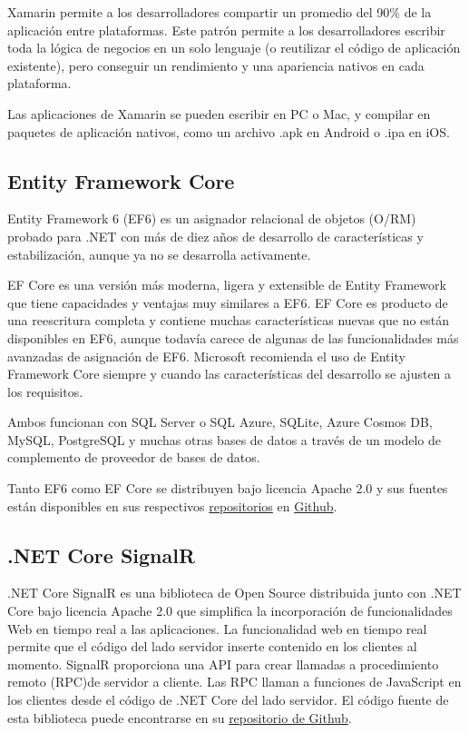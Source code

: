 Xamarin permite a los desarrolladores compartir un promedio del 90\% de la aplicación entre plataformas. Este patrón permite a los desarrolladores escribir toda la lógica de negocios en un solo lenguaje (o reutilizar el código de aplicación existente), pero conseguir un rendimiento y una apariencia nativos en cada plataforma.

Las aplicaciones de Xamarin se pueden escribir en PC o Mac, y compilar en paquetes de aplicación nativos, como un archivo .apk en Android o .ipa en iOS.

\subsection{Entity Framework Core}
Entity Framework 6 (EF6) es un asignador relacional de objetos (O/RM) probado para .NET con más de diez años de desarrollo de características y estabilización, aunque ya no se desarrolla activamente.

EF Core es una versión más moderna, ligera y extensible de Entity Framework que tiene capacidades y ventajas muy similares a EF6. EF Core es producto de una reescritura completa y contiene muchas características nuevas que no están disponibles en EF6, aunque todavía carece de algunas de las funcionalidades más avanzadas de asignación de EF6. Microsoft recomienda el uso de Entity Framework Core siempre y cuando las características del desarrollo se ajusten a los requisitos.

Ambos funcionan con SQL Server o SQL Azure, SQLite, Azure Cosmos DB, MySQL, PostgreSQL y muchas otras bases de datos a través de un modelo de complemento de proveedor de bases de datos.

Tanto EF6 como EF Core se distribuyen bajo licencia Apache 2.0 y sus fuentes están disponibles en sus respectivos \href{https://github.com/dotnet/ef6}{repositorios} en \href{https://github.com/dotnet/efcore}{Github}.

\subsection{.NET Core SignalR}
.NET Core SignalR es una biblioteca de Open Source distribuida junto con .NET Core bajo licencia Apache 2.0 que simplifica la incorporación de funcionalidades Web en tiempo real a las aplicaciones. La funcionalidad web en tiempo real permite que el código del lado servidor inserte contenido en los clientes al momento. SignalR proporciona una API para crear llamadas a procedimiento remoto (RPC)de servidor a cliente. Las RPC llaman a funciones de JavaScript en los clientes desde el código de .NET Core del lado servidor. El código fuente de esta biblioteca puede encontrarse en su \href{https://github.com/dotnet/AspNetCore/tree/master/src/SignalR}{repositorio de Github}.

